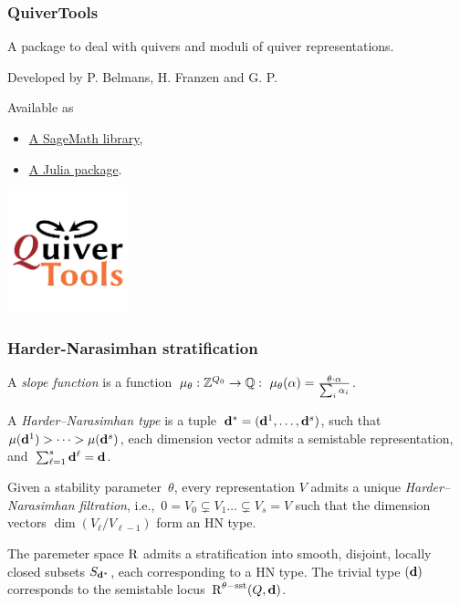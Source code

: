 \documentclass{beamer}
\begin{document}
\begin{frame}
    \frametitle{QuiverTools}
A package to deal with quivers and moduli of quiver representations. \pause

Developed by P. Belmans, H. Franzen and G. P. \pause

Available as

\begin{itemize}
    \item \href{quivertools.github.io/QuiverTools}{A SageMath library},
    \item \href{quivertools.github.io/QuiverTools.jl}{A Julia package}.
\end{itemize}\pause
\begin{center}
\includegraphics[width=100pt]{quivertools-logo.png}
\end{center}
\end{frame}

\begin{frame}
    \frametitle{Harder-Narasimhan stratification}
A \emph{slope function} is a function~$\mu_{\theta} : \mathbb{Z}^{Q_0} \overset{}{\rightarrow} \mathbb{Q}: ~\mu_{\theta}(\alpha) = \frac{\theta \cdot \alpha}{\sum_i \alpha_i}$. \pause
\begin{definition}

A \emph{Harder--Narasimhan type} is a
tuple~$\mathbf{d}^* = (\mathbf{d}^1,\dots,\mathbf{d}^s)$, such
that~$\mu(\mathbf{d}^1) > \dots > \mu(\mathbf{d}^s)$, each dimension
vector admits a semistable representation,
and~$\sum_{\ell = 1}^{s}\mathbf{d}^{\ell} = \mathbf{d}$. \pause

Given a stability parameter~$\theta$, every representation $V$
admits a unique \emph{Harder--Narasimhan filtration},
i.e.,~$0 = V_0 \subsetneq V_1 \dots \subsetneq V_s = V$ such that the
dimension vectors $\dim(V_{\ell}/V_{\ell-1})$ form an HN type.
\end{definition} \pause

\begin{theorem}
The paremeter space $\operatorname{R}$ admits a stratification into
smooth, disjoint, locally closed subsets $S_{\mathbf{d}^*}$, each corresponding
to a HN type. The trivial type $(\mathbf{d})$ corresponds to the semistable
locus~$\operatorname{R}^{\theta-\mathrm{sst}}(Q, \mathbf{d})$.
\end{theorem}

\end{frame}
\end{document}
